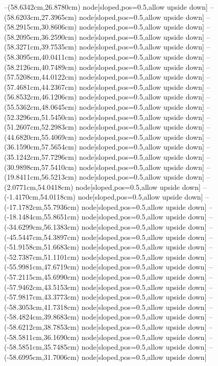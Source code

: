 --(58.6342cm,26.8780cm) node[sloped,pos=0.5,allow upside down]{\ArrowIn}
--(58.6203cm,27.3965cm) node[sloped,pos=0.5,allow upside down]{\arrowIn}
--(58.2915cm,30.8606cm) node[sloped,pos=0.5,allow upside down]{\ArrowIn}
--(58.2095cm,36.2590cm) node[sloped,pos=0.5,allow upside down]{\ArrowIn}
--(58.3271cm,39.7535cm) node[sloped,pos=0.5,allow upside down]{\ArrowIn}
--(58.3095cm,40.0411cm) node[sloped,pos=0.5,allow upside down]{\arrowIn}
--(58.2126cm,40.7489cm) node[sloped,pos=0.5,allow upside down]{\arrowIn}
--(57.5208cm,44.0122cm) node[sloped,pos=0.5,allow upside down]{\ArrowIn}
--(57.4681cm,44.2367cm) node[sloped,pos=0.5,allow upside down]{\arrowIn}
--(56.8532cm,46.1206cm) node[sloped,pos=0.5,allow upside down]{\ArrowIn}
--(55.5362cm,48.0645cm) node[sloped,pos=0.5,allow upside down]{\ArrowIn}
--(52.3296cm,51.5450cm) node[sloped,pos=0.5,allow upside down]{\ArrowIn}
--(51.2607cm,52.2983cm) node[sloped,pos=0.5,allow upside down]{\ArrowIn}
--(44.6820cm,55.4069cm) node[sloped,pos=0.5,allow upside down]{\ArrowIn}
--(36.1590cm,57.5654cm) node[sloped,pos=0.5,allow upside down]{\ArrowIn}
--(35.1242cm,57.7296cm) node[sloped,pos=0.5,allow upside down]{\ArrowIn}
--(30.9898cm,57.5410cm) node[sloped,pos=0.5,allow upside down]{\ArrowIn}
--(19.8411cm,56.5213cm) node[sloped,pos=0.5,allow upside down]{\ArrowIn}
--(2.0771cm,54.0418cm) node[sloped,pos=0.5,allow upside down]{\ArrowIn}
--(-1.4170cm,54.0118cm) node[sloped,pos=0.5,allow upside down]{\ArrowIn}
--(-17.1782cm,55.7936cm) node[sloped,pos=0.5,allow upside down]{\ArrowIn}
--(-18.1484cm,55.8651cm) node[sloped,pos=0.5,allow upside down]{\arrowIn}
--(-34.6299cm,56.1383cm) node[sloped,pos=0.5,allow upside down]{\ArrowIn}
--(-45.5447cm,54.3897cm) node[sloped,pos=0.5,allow upside down]{\ArrowIn}
--(-51.9158cm,51.6683cm) node[sloped,pos=0.5,allow upside down]{\ArrowIn}
--(-52.7387cm,51.1101cm) node[sloped,pos=0.5,allow upside down]{\arrowIn}
--(-55.9981cm,47.6719cm) node[sloped,pos=0.5,allow upside down]{\ArrowIn}
--(-57.2115cm,45.6990cm) node[sloped,pos=0.5,allow upside down]{\ArrowIn}
--(-57.9462cm,43.5153cm) node[sloped,pos=0.5,allow upside down]{\ArrowIn}
--(-57.9817cm,43.3773cm) node[sloped,pos=0.5,allow upside down]{\arrowIn}
--(-58.3053cm,41.7318cm) node[sloped,pos=0.5,allow upside down]{\ArrowIn}
--(-58.4824cm,39.8683cm) node[sloped,pos=0.5,allow upside down]{\ArrowIn}
--(-58.6212cm,38.7853cm) node[sloped,pos=0.5,allow upside down]{\ArrowIn}
--(-58.5811cm,36.1690cm) node[sloped,pos=0.5,allow upside down]{\ArrowIn}
--(-58.5851cm,35.7485cm) node[sloped,pos=0.5,allow upside down]{\arrowIn}
--(-58.6995cm,31.7006cm) node[sloped,pos=0.5,allow upside down]{\ArrowIn}
